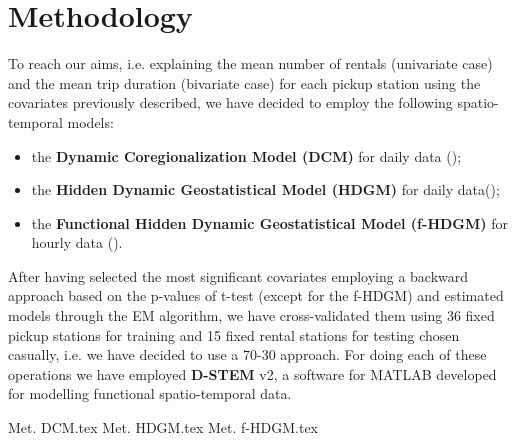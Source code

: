 \section{Methodology}
To reach our aims, i.e. explaining the mean number of rentals (univariate case) and the mean trip duration (bivariate case) for each pickup station using the covariates previously described, we have decided to employ the following spatio-temporal models:
\begin{itemize}
	\item the \textbf{Dynamic Coregionalization Model (DCM)} for daily data (\cite{dcm});
	\item the \textbf{Hidden Dynamic Geostatistical Model (HDGM)} for daily data(\cite{hdgm});
	\item the \textbf{Functional Hidden Dynamic Geostatistical Model (f-HDGM)} for hourly data (\cite{dstem}).
\end{itemize}
After having selected the most significant covariates employing a backward approach based on the p-values of t-test (except for the f-HDGM) and estimated models through the EM algorithm, we have cross-validated them using \num{36} fixed pickup stations for training and \num{15} fixed rental stations for testing chosen casually, i.e. we have decided to use a \num{70}-\num{30} approach. For doing each of these operations we have employed \textbf{D-STEM} v\num{2}, a software for MATLAB developed for modelling functional spatio-temporal data.

{Met. DCM.tex}
{Met. HDGM.tex}
{Met. f-HDGM.tex}